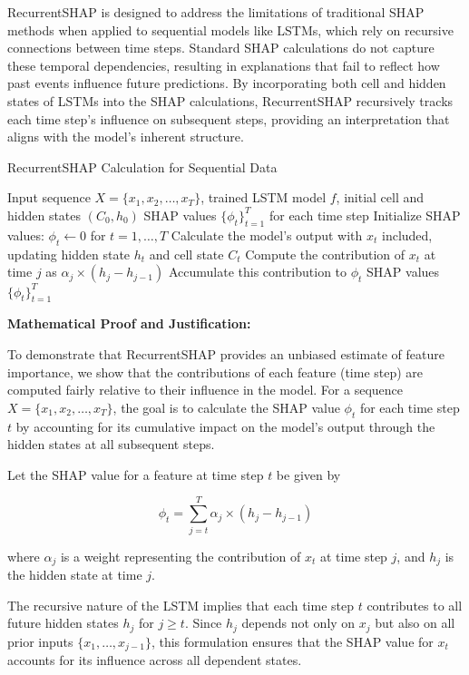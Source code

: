 RecurrentSHAP is designed to address the limitations of traditional SHAP methods when applied to sequential models like LSTMs, which rely on recursive connections between time steps. Standard SHAP calculations do not capture these temporal dependencies, resulting in explanations that fail to reflect how past events influence future predictions. By incorporating both cell and hidden states of LSTMs into the SHAP calculations, RecurrentSHAP recursively tracks each time step’s influence on subsequent steps, providing an interpretation that aligns with the model’s inherent structure.

\begin{algorithm}
\caption{RecurrentSHAP Calculation for Sequential Data}
\begin{algorithmic}[1]
\Require Input sequence $X = \{x_1, x_2, \ldots, x_T\}$, trained LSTM model $f$, initial cell and hidden states $(C_0, h_0)$
\Ensure SHAP values $\{\phi_t\}_{t=1}^T$ for each time step
\State Initialize SHAP values: $\phi_t \gets 0$ for $t = 1, \ldots, T$
    \State Calculate the model’s output with $x_t$ included, updating hidden state $h_t$ and cell state $C_t$
        \State Compute the contribution of $x_t$ at time $j$ as $\alpha_j \times (h_j - h_{j-1})$
        \State Accumulate this contribution to $\phi_t$
    \EndFor
\EndFor
\State \Return SHAP values $\{\phi_t\}_{t=1}^T$
\end{algorithmic}
\end{algorithm}

\textbf{Mathematical Proof and Justification:}

To demonstrate that RecurrentSHAP provides an unbiased estimate of feature importance, we show that the contributions of each feature (time step) are computed fairly relative to their influence in the model. For a sequence \( X = \{x_1, x_2, \ldots, x_T\} \), the goal is to calculate the SHAP value \( \phi_t \) for each time step \( t \) by accounting for its cumulative impact on the model’s output through the hidden states at all subsequent steps.

Let the SHAP value for a feature at time step \( t \) be given by

\[
\phi_t = \sum_{j=t}^{T} \alpha_j \times \left( h_j - h_{j-1} \right)
\]

where \( \alpha_j \) is a weight representing the contribution of \( x_t \) at time step \( j \), and \( h_j \) is the hidden state at time \( j \).

The recursive nature of the LSTM implies that each time step \( t \) contributes to all future hidden states \( h_j \) for \( j \geq t \). Since \( h_j \) depends not only on \( x_j \) but also on all prior inputs \( \{x_1, \ldots, x_{j-1}\} \), this formulation ensures that the SHAP value for \( x_t \) accounts for its influence across all dependent states.

